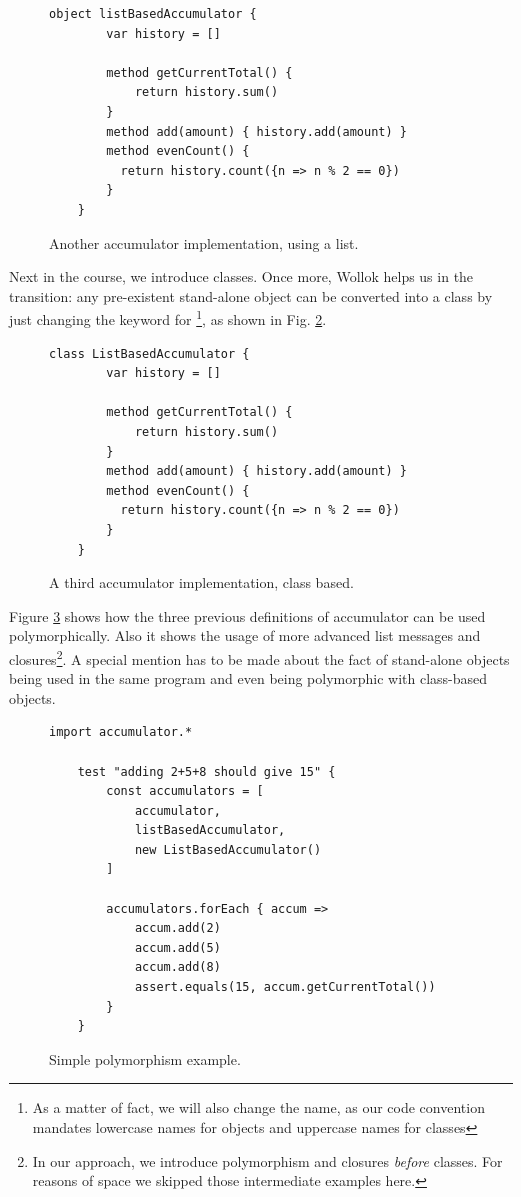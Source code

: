 \begin{figure}[ht]
 \centering
 \begin{lstlisting}[language=Wollok]
	object listBasedAccumulator {
		var history = []
		
		method getCurrentTotal() {
			return history.sum()
		}
		method add(amount) { history.add(amount) }
		method evenCount() {
		  return history.count({n => n % 2 == 0})
		}
	}
 \end{lstlisting}
 
 \caption{\small Another accumulator implementation, using a list.}
 \label{fig:accumulator/list}
\end{figure}

\medskip
Next in the course, we introduce classes.
Once more, Wollok helps us in the transition: any pre-existent stand-alone object can be converted into a class by just changing the keyword  for \footnote{As a matter of fact, we will also change the name, as our code convention mandates lowercase names for objects and uppercase names for classes}, as shown in Fig. \ref{fig:accumulator/classes}.

\begin{figure}[ht]
 \centering
 \begin{lstlisting}[language=Wollok]
	class ListBasedAccumulator {
		var history = []
		
		method getCurrentTotal() { 
			return history.sum() 
		}
		method add(amount) { history.add(amount) }
		method evenCount() { 
		  return history.count({n => n % 2 == 0})
		}
	}
 \end{lstlisting}
 
 \caption{\small A third accumulator implementation, class based.}
 \label{fig:accumulator/classes}
\end{figure}

\medskip
Figure \ref{fig:polymorphism} shows how the three previous definitions of accumulator can be used polymorphically. 
Also it shows the usage of more advanced list messages and closures\footnote{In our approach, we introduce polymorphism and closures \emph{before} classes. For reasons of space we skipped those intermediate examples here.}.
A special mention has to be made about the fact of stand-alone objects being used in the same program and even being polymorphic with class-based objects.

\begin{figure}[ht]
 \centering
 \begin{lstlisting}[language=Wollok]
 	import accumulator.*

	test "adding 2+5+8 should give 15" {
		const accumulators = [ 
			accumulator, 
			listBasedAccumulator,
			new ListBasedAccumulator()
		]

		accumulators.forEach { accum =>
			accum.add(2)
			accum.add(5)
			accum.add(8)
			assert.equals(15, accum.getCurrentTotal())	
		}
	}
 \end{lstlisting}
 
 \caption{\small Simple polymorphism example.}
 \label{fig:polymorphism}
\end{figure}


